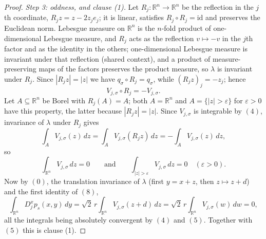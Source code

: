 \begin{proof}
\emph{Step 3: oddness, and clause (1).}
Let $R_j : \mathbb{R}^n \to \mathbb{R}^n$ be the reflection in the $j$th
coordinate, $R_jz = z - 2z_je_j$; it is linear, satisfies $R_j\circ R_j =
\mathrm{id}$ and preserves the Euclidean norm.  Lebesgue measure on
$\mathbb{R}^n$ is the $n$-fold product of one-dimensional Lebesgue measure, and
$R_j$ acts as the reflection $v \mapsto -v$ in the $j$th factor and as the
identity in the others; one-dimensional Lebesgue measure is invariant under that
reflection (shared context), and a product of measure-preserving maps of the
factors preserves the product measure, so $\lambda$ is invariant under $R_j$.
Since $|R_jz| = |z|$ we have
$q_\sigma\circ R_j = q_\sigma$, while $(R_jz)_j = -z_j$; hence
\[
  V_{j,\sigma}\circ R_j = -V_{j,\sigma} .
\]
Let $A \subseteq \mathbb{R}^n$ be Borel with $R_j(A) = A$; both $A = \mathbb{R}^n$
and $A = \{|z| > \varepsilon\}$ for $\varepsilon > 0$ have this property, the
latter because $|R_jz| = |z|$.  Since $V_{j,\sigma}$ is integrable by $(4)$,
invariance of $\lambda$ under $R_j$ gives
\[
  \int_A V_{j,\sigma}(z)\,dz
    = \int_A V_{j,\sigma}(R_jz)\,dz
    = -\int_A V_{j,\sigma}(z)\,dz ,
\]
so
\begin{equation*}
  \int_{\mathbb{R}^n} V_{j,\sigma}\,dz = 0
  \qquad\text{and}\qquad
  \int_{|z|>\varepsilon} V_{j,\sigma}\,dz = 0
  \quad(\varepsilon>0) . \tag{8}
\end{equation*}
Now by $(0)$, the translation invariance of $\lambda$ (first $y = x+z$, then
$z \mapsto z+d$) and the first identity of $(8)$,
\[
  \int_{\mathbb{R}^n} D_j^xp_s(x,y)\,dy
    = \sqrt2\,r\int_{\mathbb{R}^n}V_{j,\sigma}(z+d)\,dz
    = \sqrt2\,r\int_{\mathbb{R}^n}V_{j,\sigma}(w)\,dw
    = 0 ,
\]
all the integrals being absolutely convergent by $(4)$ and $(5)$.  Together with
$(5)$ this is clause (1).


\end{proof}
